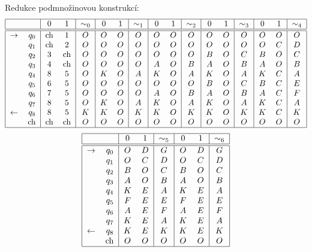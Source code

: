 Redukce podmnožinovou konstrukcí:
\[
    \begin{tabular}{|r r|c c|c|c c|c|c c|c|c c|c|c c|c|}
        \hline
        & & $0$ & $1$ & $\sim_0$ & $0$ & $1$ & $\sim_1$ & $0$ & $1$ & $\sim_2$ & $0$ & $1$ & $\sim_3$ & $0$ & $1$ & $\sim_4$ \\ \hline \hline
        $\rightarrow$ & $q_0$ & ch &$1$ &$O$ &$O$ &$O$ &$O$ &$O$ &$O$ &$O$ &$O$ &$O$ &$O$ &$O$ &$O$ &$O$\\
                & $q_1$ & ch &$2$ &$O$ &$O$ &$O$ &$O$ &$O$ &$O$ &$O$ &$O$ &$O$ &$O$ &$O$ &$C$ &$D$ \\
                & $q_2$ &$3$ & ch &$O$ &$O$ &$O$ &$O$ &$O$ &$O$ &$O$ &$B$ &$O$ &$C$ &$B$ &$O$ &$C$ \\
                & $q_3$ &$4$ & ch &$O$ &$O$ &$O$ &$O$ &$A$ &$O$ &$B$ &$A$ &$O$ &$B$ &$A$ &$O$ &$B$ \\
                & $q_4$ &$8$ &$5$ &$O$ &$K$ &$O$ &$A$ &$K$ &$O$ &$A$ &$K$ &$O$ &$A$ &$K$ &$C$ &$A$ \\
                & $q_5$ &$6$ &$5$ &$O$ &$O$ &$O$ &$O$ &$O$ &$O$ &$O$ &$B$ &$O$ &$C$ &$B$ &$C$ &$E$ \\
                & $q_6$ &$7$ &$5$ &$O$ &$O$ &$O$ &$O$ &$A$ &$O$ &$B$ &$A$ &$O$ &$B$ &$A$ &$C$ &$F$ \\
                & $q_7$ &$8$ &$5$ &$O$ &$K$ &$O$ &$A$ &$K$ &$O$ &$A$ &$K$ &$O$ &$A$ &$K$ &$C$ &$A$ \\
        $\leftarrow$ & $q_8$ &$8$ &$5$ &$K$ &$K$ &$O$ &$K$ &$K$ &$O$ &$K$ &$K$ &$O$ &$K$ &$K$ &$C$ &$K$ \\
                & ch    &ch  & ch &$O$ &$O$ &$O$ &$O$ &$O$ &$O$ &$O$ &$O$ &$O$ &$O$ &$O$ &$O$ &$O$ \\
        \hline
    \end{tabular}
\]
\[
    \begin{tabular}{|r r|c c|c|c c| c|}
        \hline
        & & $0$ & $1$ & $\sim_5$ & $0$ & $1$ & $\sim_6$ \\ \hline \hline
        $\rightarrow$ & $q_0$ &$O$ &$D$ &$G$ &$O$ &$D$ &$G$\\
                & $q_1$ &$O$ &$C$ &$D$ &$O$ &$C$ &$D$\\
                & $q_2$ &$B$ &$O$ &$C$ &$B$ &$O$ &$C$\\
                & $q_3$ &$A$ &$O$ &$B$ &$A$ &$O$ &$B$\\
                & $q_4$ &$K$ &$E$ &$A$ &$K$ &$E$ &$A$\\
                & $q_5$ &$F$ &$E$ &$E$ &$F$ &$E$ &$E$\\
                & $q_6$ &$A$ &$E$ &$F$ &$A$ &$E$ &$F$\\
                & $q_7$ &$K$ &$E$ &$A$ &$K$ &$E$ &$A$\\
        $\leftarrow$ & $q_8$ &$K$ &$E$ &$K$ &$K$ &$E$ &$K$\\
                & ch    &$O$ &$O$ &$O$ &$O$ &$O$ &$O$\\
        \hline
    \end{tabular}
\]

